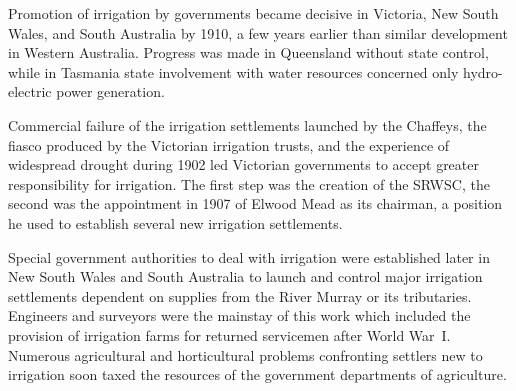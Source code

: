 \closure
Promotion of irrigation by governments became decisive in Victoria,
New South Wales, and South Australia by 1910, a few years earlier than
similar development in Western Australia.  Progress was made in
Queensland without state control, while in Tasmania state involvement
with water resources concerned only hydro-electric power generation.

Commercial failure of the irrigation settlements launched by the
Chaffeys, the fiasco produced by the Victorian irrigation trusts, and
the experience of widespread drought during 1902 led Victorian
governments to accept greater responsibility for irrigation.  The
first step was the creation of the SRWSC, the second was the
appointment in 1907 of Elwood Mead as its chairman, a position he used
to establish several new irrigation settlements.

Special government authorities to deal with irrigation were
established later in New South Wales and South Australia to launch and
control major irrigation settlements dependent on supplies from the
River Murray or its tributaries.  Engineers and surveyors were the
mainstay of this work which included the provision of irrigation farms
for returned servicemen after World War~I.  Numerous agricultural and
horticultural problems confronting settlers new to irrigation soon
taxed the resources of the government departments of agriculture.

